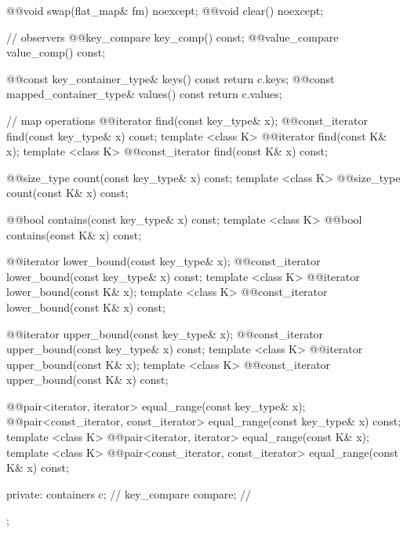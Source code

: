 \begin{codeblock}
{{    @@void swap(flat_map& fm) noexcept;
    @@void clear() noexcept;

    // observers
    @@key_compare key_comp() const;
    @@value_compare value_comp() const;

    @@const key_container_type& keys() const      { return c.keys; }
    @@const mapped_container_type& values() const { return c.values; }

    // map operations
    @@iterator find(const key_type& x);
    @@const_iterator find(const key_type& x) const;
    template <class K> @@iterator find(const K& x);
    template <class K> @@const_iterator find(const K& x) const;

    @@size_type count(const key_type& x) const;
    template <class K> @@size_type count(const K& x) const;

    @@bool contains(const key_type& x) const;
    template <class K> @@bool contains(const K& x) const;

    @@iterator lower_bound(const key_type& x);
    @@const_iterator lower_bound(const key_type& x) const;
    template <class K> @@iterator lower_bound(const K& x);
    template <class K> @@const_iterator lower_bound(const K& x) const;

    @@iterator upper_bound(const key_type& x);
    @@const_iterator upper_bound(const key_type& x) const;
    template <class K> @@iterator upper_bound(const K& x);
    template <class K> @@const_iterator upper_bound(const K& x) const;

    @@pair<iterator, iterator> equal_range(const key_type& x);
    @@pair<const_iterator, const_iterator> equal_range(const key_type& x) const;
    template <class K>
      @@pair<iterator, iterator> equal_range(const K& x);
    template <class K>
      @@pair<const_iterator, const_iterator> equal_range(const K& x) const;

  private:
    containers c;        // \expos
    key_compare compare; // \expos
  };
}
\end{codeblock}

\noindent\makebox[\linewidth]{\rule{\textwidth}{0.4pt}}

